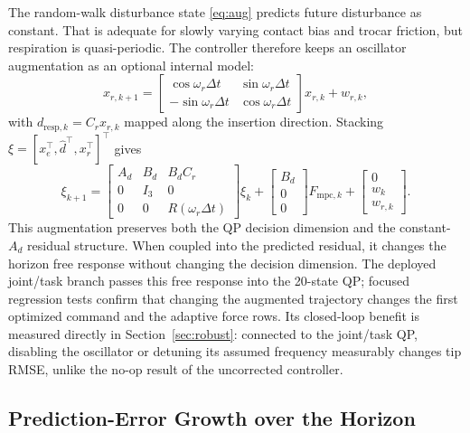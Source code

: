 The random-walk disturbance state \eqref{eq:aug} predicts future disturbance as constant. That is adequate for slowly varying contact bias and trocar friction, but respiration is quasi-periodic. The controller therefore keeps an oscillator augmentation as an optional internal model:
\begin{equation}
x_{r,k+1} =
\begin{bmatrix}
\cos\omega_r\Delta t & \sin\omega_r\Delta t\\
-\sin\omega_r\Delta t & \cos\omega_r\Delta t
\end{bmatrix}x_{r,k}+w_{r,k},
\label{eq:osc}
\end{equation}
with $d_{\mathrm{resp},k}=C_rx_{r,k}$ mapped along the insertion direction. Stacking $\xi=[x_e^\top,\hat d^\top,x_r^\top]^\top$ gives
\begin{equation}
\xi_{k+1}=
\begin{bmatrix}
A_d & B_d & B_dC_r\\
0 & I_3 & 0\\
0 & 0 & R(\omega_r\Delta t)
\end{bmatrix}\xi_k+
\begin{bmatrix}B_d\\0\\0\end{bmatrix}F_{\mathrm{mpc},k}+
\begin{bmatrix}0\\w_k\\w_{r,k}\end{bmatrix}.
\label{eq:aug_osc}
\end{equation}
This augmentation preserves both the QP decision dimension and the constant-$A_d$ residual structure. When coupled into the predicted residual, it changes the horizon free response without changing the decision dimension. The deployed joint/task branch passes this free response into the 20-state QP; focused regression tests confirm that changing the augmented trajectory changes the first optimized command and the adaptive force rows. Its closed-loop benefit is measured directly in Section~\ref{sec:robust}: connected to the joint/task QP, disabling the oscillator or detuning its assumed frequency measurably changes tip RMSE, unlike the no-op result of the uncorrected controller.

\subsection{Prediction-Error Growth over the Horizon}\label{sec:validity}

